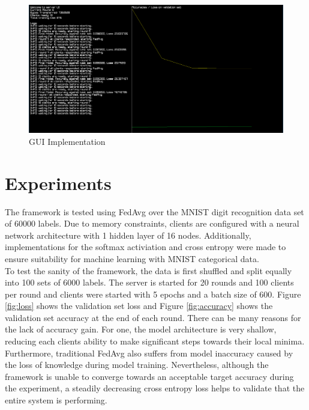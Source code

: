 \documentclass[12pt]{article}
\begin{document}
\begin{figure}
  \includegraphics[scale=0.3]{gui}
  \caption{GUI Implementation}
  \label{fig:gui}
\centering
\end{figure}

\section{Experiments}\label{experiments}
The framework is tested using FedAvg over the MNIST digit recognition data set of 60000 labels. Due to memory
constraints, clients are configured with a neural network architecture with 1 hidden layer of 16
nodes. Additionally, implementations for the softmax activiation and cross entropy were made to
ensure suitability for machine learning with MNIST categorical data.\\

To test the sanity of the framework, the data is first shuffled and split equally into 100 sets of 6000 labels.
The server is started for 20 rounds and 100 clients per round and clients were started with 5 epochs and a batch size of 600.
Figure \ref{fig:loss} shows the validation set loss and Figure \ref{fig:accuracy} shows the
validation set accuracy at the end of each round. There can be many reasons for the lack of
accuracy gain. For one, the model architecture is very shallow, reducing each clients ability to
make significant steps towards their local minima. Furthermore, traditional FedAvg also suffers from
model inaccuracy caused by the loss of knowledge during model training\cite{hinton2015distilling}. Nevertheless, although the framework is unable to converge
towards an acceptable target accuracy during the experiment, a steadily decreasing cross entropy
loss helps to validate that the entire system is performing.
\end{document}
